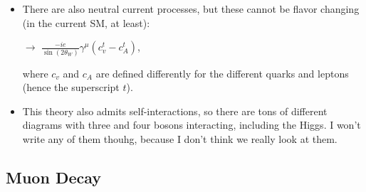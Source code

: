 \begin{itemize}
\item There are also neutral current processes, but these cannot be flavor changing (in the current SM, at least):
  \begin{center}
    \hspace*{0.5cm}$\rightarrow$\hspace*{0.5cm}
    $\displaystyle \frac{-ie}{\sin(2\theta_W)} \gamma^\mu(c_v^t - c_A^t)$,
  \end{center}
  where $c_v$ and $c_A$ are defined differently for the different quarks and leptons (hence the superscript $t$).

\item This theory also admits self-interactions, so there are tons of different diagrams with three and four bosons interacting, including the Higgs. I won't write any of them thouhg, because I don't think we really look at them.
\end{itemize}







\subsection{Muon Decay}


